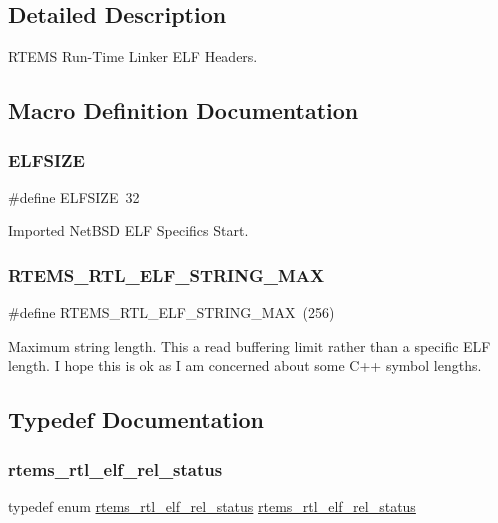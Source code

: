 \subsection{Detailed Description}
R\+T\+E\+MS Run-\/\+Time Linker E\+LF Headers. 



\subsection{Macro Definition Documentation}
\mbox{\label{rtl-elf_8h_a3f81993a8a64147f5eb005b3c5351455}} 
\subsubsection{\texorpdfstring{ELFSIZE}{ELFSIZE}}
{\footnotesize\ttfamily \#define E\+L\+F\+S\+I\+ZE~32}

Imported Net\+B\+SD E\+LF Specifics Start. \mbox{\label{rtl-elf_8h_a9fb1485c239041baebe15f93bab01fca}} 
\subsubsection{\texorpdfstring{RTEMS\_RTL\_ELF\_STRING\_MAX}{RTEMS\_RTL\_ELF\_STRING\_MAX}}
{\footnotesize\ttfamily \#define R\+T\+E\+M\+S\+\_\+\+R\+T\+L\+\_\+\+E\+L\+F\+\_\+\+S\+T\+R\+I\+N\+G\+\_\+\+M\+AX~(256)}

Maximum string length. This a read buffering limit rather than a specific E\+LF length. I hope this is ok as I am concerned about some C++ symbol lengths. 

\subsection{Typedef Documentation}
\mbox{\label{rtl-elf_8h_a2e417b11a8da689fc4be1d81b94b9817}} 
\subsubsection{\texorpdfstring{rtems\_rtl\_elf\_rel\_status}{rtems\_rtl\_elf\_rel\_status}}
{\footnotesize\ttfamily typedef enum \mbox{\hyperlink{rtl-elf_8h_a97d7ca039fc1123f4ca0c7b43d4a811f}{rtems\+\_\+rtl\+\_\+elf\+\_\+rel\+\_\+status}}  \mbox{\hyperlink{rtl-elf_8h_a97d7ca039fc1123f4ca0c7b43d4a811f}{rtems\+\_\+rtl\+\_\+elf\+\_\+rel\+\_\+status}}}


